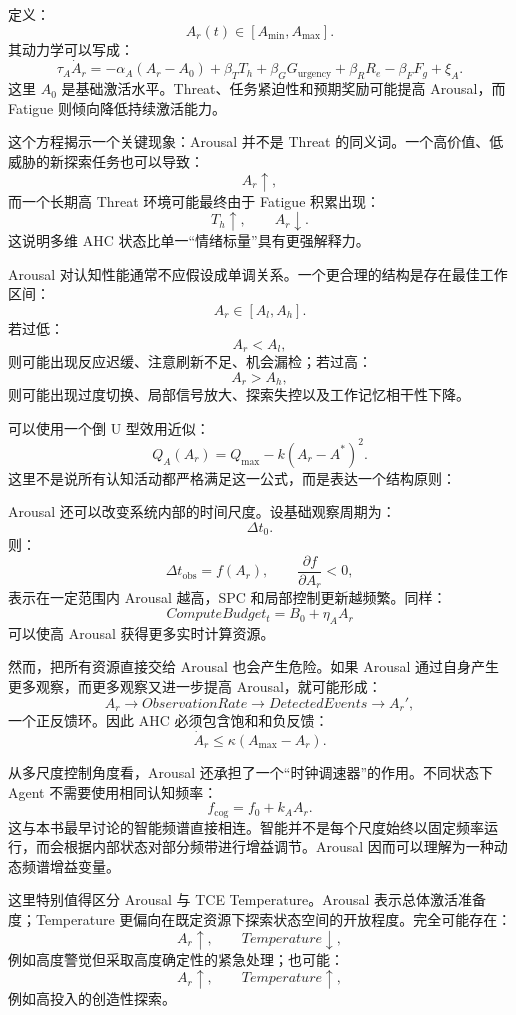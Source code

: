 定义：
\[
A_r(t)\in[A_{\min},A_{\max}].
\]
其动力学可以写成：
\[
\tau_A\dot A_r
=
-\alpha_A(A_r-A_0)
+
\beta_T T_h
+
\beta_G G_{\mathrm{urgency}}
+
\beta_R R_e
-
\beta_F F_g
+
\xi_A.
\]
这里 \(A_0\) 是基础激活水平。Threat、任务紧迫性和预期奖励可能提高 Arousal，而 Fatigue 则倾向降低持续激活能力。

这个方程揭示一个关键现象：Arousal 并不是 Threat 的同义词。一个高价值、低威胁的新探索任务也可以导致：
\[
A_r\uparrow,
\]
而一个长期高 Threat 环境可能最终由于 Fatigue 积累出现：
\[
T_h\uparrow,\qquad A_r\downarrow.
\]
这说明多维 AHC 状态比单一“情绪标量”具有更强解释力。

Arousal 对认知性能通常不应假设成单调关系。一个更合理的结构是存在最佳工作区间：
\[
A_r\in[A_l,A_h].
\]
若过低：
\[
A_r<A_l,
\]
则可能出现反应迟缓、注意刷新不足、机会漏检；若过高：
\[
A_r>A_h,
\]
则可能出现过度切换、局部信号放大、探索失控以及工作记忆相干性下降。

可以使用一个倒 U 型效用近似：
\[
Q_A(A_r)
=
Q_{\max}
-
k(A_r-A^\ast)^2.
\]
这里不是说所有认知活动都严格满足这一公式，而是表达一个结构原则：
\begin{statementbox}
\centering
{}
\end{statementbox}

Arousal 还可以改变系统内部的时间尺度。设基础观察周期为：
\[
\Delta t_0.
\]
则：
\[
\Delta t_{\mathrm{obs}}
=
f(A_r),
\qquad
\frac{\partial f}{\partial A_r}<0,
\]
表示在一定范围内 Arousal 越高，SPC 和局部控制更新越频繁。同样：
\[
ComputeBudget_t
=
B_0+\eta_AA_r
\]
可以使高 Arousal 获得更多实时计算资源。

然而，把所有资源直接交给 Arousal 也会产生危险。如果 Arousal 通过自身产生更多观察，而更多观察又进一步提高 Arousal，就可能形成：
\[
A_r
\rightarrow
ObservationRate
\rightarrow
DetectedEvents
\rightarrow
A_r',
\]
一个正反馈环。因此 AHC 必须包含饱和和负反馈：
\[
\dot A_r
\leq
\kappa(A_{\max}-A_r).
\]

从多尺度控制角度看，Arousal 还承担了一个“时钟调速器”的作用。不同状态下 Agent 不需要使用相同认知频率：
\[
f_{\mathrm{cog}}
=
f_0
+
k_A A_r.
\]
这与本书最早讨论的智能频谱直接相连。智能并不是每个尺度始终以固定频率运行，而会根据内部状态对部分频带进行增益调节。Arousal 因而可以理解为一种动态频谱增益变量。

这里特别值得区分 Arousal 与 TCE Temperature。Arousal 表示总体激活准备度；Temperature 更偏向在既定资源下探索状态空间的开放程度。完全可能存在：
\[
A_r\uparrow,\qquad Temperature\downarrow,
\]
例如高度警觉但采取高度确定性的紧急处理；也可能：
\[
A_r\uparrow,\qquad Temperature\uparrow,
\]
例如高投入的创造性探索。

